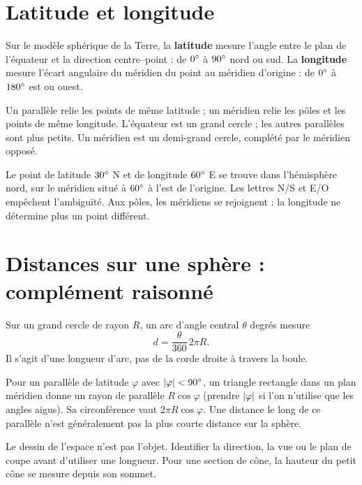 \documentclass[../cours_3e.tex]{subfiles}
\begin{document}
\section{Latitude et longitude}
\begin{definition}
Sur le modèle sphérique de la Terre, la \textbf{latitude} mesure l'angle entre le plan de l'équateur et la direction centre--point : de $0^{\circ}$ à $90^{\circ}$ nord ou sud. La \textbf{longitude} mesure l'écart angulaire du méridien du point au méridien d'origine : de $0^{\circ}$ à $180^{\circ}$ est ou ouest.
\end{definition}
\begin{center}
\end{center}
Un parallèle relie les points de même latitude ; un méridien relie les pôles et les points de même longitude. L'équateur est un grand cercle ; les autres parallèles sont plus petits. Un méridien est un demi-grand cercle, complété par le méridien opposé.

Le point de latitude $30^{\circ}$ N et de longitude $60^{\circ}$ E se trouve dans l'hémisphère nord, sur le méridien situé à $60^{\circ}$ à l'est de l'origine. Les lettres N/S et E/O empêchent l'ambiguïté. Aux pôles, les méridiens se rejoignent : la longitude ne détermine plus un point différent.
\section{Distances sur une sphère : complément raisonné}
Sur un grand cercle de rayon $R$, un arc d'angle central $\theta$ degrés mesure
\[d=\frac{\theta}{360}\,2\pi R.\]
Il s'agit d'une longueur d'arc, pas de la corde droite à travers la boule.

Pour un parallèle de latitude $\varphi$ avec $\left|\varphi\right|<90^{\circ}$, un triangle rectangle dans un plan méridien donne un rayon de parallèle $R\cos\varphi$ (prendre $\left|\varphi\right|$ si l'on n'utilise que les angles aigus). Sa circonférence vaut $2\pi R\cos\varphi$. Une distance le long de ce parallèle n'est généralement pas la plus courte distance sur la sphère.
\begin{retenir}
Le dessin de l'espace n'est pas l'objet. Identifier la direction, la vue ou le plan de coupe avant d'utiliser une longueur. Pour une section de cône, la hauteur du petit cône se mesure depuis son sommet.
\end{retenir}
\end{document}
